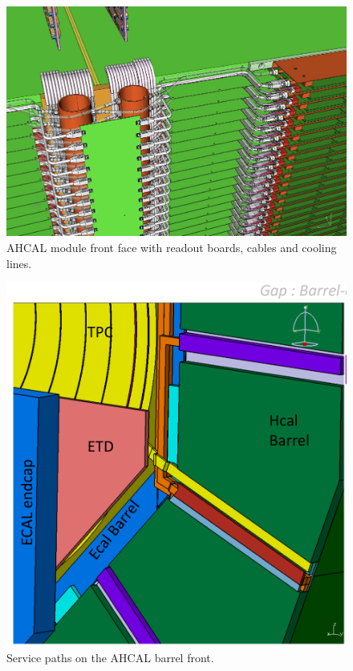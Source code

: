 \begin{figure}[h!]
    \centering
        \includegraphics[width=0.9\hsize]{Integration/fig/AHCAL_Services_Closeup.png}
    \caption{AHCAL module front face with readout boards, cables and cooling lines.}
    \label{ILD:fig:ahcal_services_closeup}
\end{figure}
\begin{figure}[h!]
    \centering
        \includegraphics[width=0.7\hsize]{Integration/fig/Barrel_Services.pdf}
    \caption{Service paths on the AHCAL barrel front.}
    \label{ILD:fig:barrel_services}
\end{figure}
